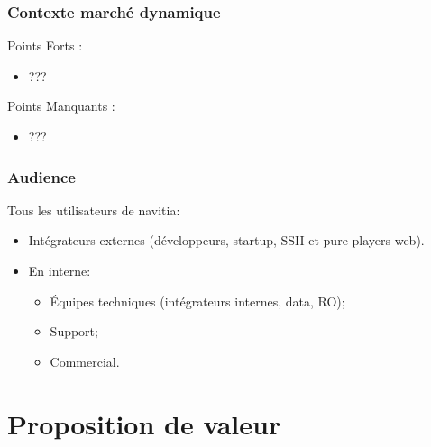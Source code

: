 \documentclass[table]{beamer}
\begin{document}
\begin{frame}
  \frametitle{Contexte marché dynamique}
  \begin{description}
    \item[Points Forts : ]
  \end{description}
  \begin{itemize}
    \item ???
  \end{itemize}
  \begin{description}
    \item[Points Manquants : ]
  \end{description}
  \begin{itemize}
    \item ???
  \end{itemize}
\end{frame}


\begin{frame}
  \frametitle{Audience}

  Tous les utilisateurs de navitia:
  \begin{itemize}
  \item Intégrateurs externes (développeurs, startup, SSII et pure
    players web).
  \item En interne:
    \begin{itemize}
    \item Équipes techniques (intégrateurs internes, data, RO);
    \item Support;
    \item Commercial.
    \end{itemize}
  \end{itemize}
\end{frame}

\section{Proposition de valeur}
\end{document}
